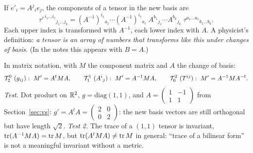 \begin{formal}
If $e'_i=A^j{}_ie_j$, the components of a tensor in the new basis are
\begin{equation}\label{eq:tensortransf}
\tau'^{\,i_1\dots i_\ell}{}_{j_1\dots j_k}=(A^{-1})^{i_1}{}_{a_1}\cdots(A^{-1})^{i_\ell}{}_{a_\ell}\;A^{b_1}{}_{j_1}\cdots A^{b_k}{}_{j_k}\;\tau^{a_1\dots a_\ell}{}_{b_1\dots b_k}.
\end{equation}
Each upper index is transformed with $A^{-1}$, each lower index with $A$. A physicist's definition: \emph{a tensor is an array of numbers that transforms like this under changes of basis}. (In the notes this appears with $B=A$.)
\end{formal}

\begin{example}
In matrix notation, with $M$ the component matrix and $A$ the change of basis:
\[
\TT{0}{2}\ (g_{ij}):\ M'=A^tMA,\qquad
\TT{1}{1}\ (A^i{}_j):\ M'=A^{-1}MA,\qquad
\TT{2}{0}\ (T^{ij}):\ M'=A^{-1}M A^{-t}.
\]
\emph{Test.} Dot product on $\mathbb{R}^2$, $g=\mathrm{diag}(1,1)$, and $A=\begin{pmatrix}1&-1\\1&1\end{pmatrix}$ from Section~\ref{sec:vs}: $g'=A^tA=\begin{pmatrix}2&0\\0&2\end{pmatrix}$: the new basis vectors are still orthogonal but have length $\sqrt2$. \emph{Test 2.} The trace of a $(1,1)$ tensor is invariant, $\operatorname{tr}(A^{-1}MA)=\operatorname{tr} M$, but $\operatorname{tr}(A^tMA)\neq\operatorname{tr} M$ in general: ``trace of a bilinear form'' is not a meaningful invariant without a metric.
\end{example}
